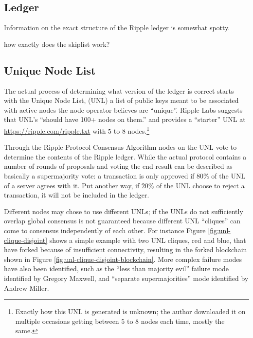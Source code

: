 \documentclass{article}
\begin{document}
\subsection{Ledger}

Information on the exact structure of the Ripple ledger is somewhat spotty.

how exactly does the skiplist work?


\subsection{Unique Node List}

The actual process of determining what version of the ledger is correct starts
with the Unique Node List, (UNL) a list of public keys meant to be associated
with active nodes the node operator believes are
``unique''.\cite{ripple-wiki-unl} Ripple Labs suggests that UNL's ``should have
100+ nodes on them.''\cite{ripple-wiki-unl} and provides a ``starter'' UNL at
\url{https://ripple.com/ripple.txt} with $5$ to $8$ nodes.\footnote{Exactly how this UNL is
generated is unknown; the author downloaded it on multiple occasions getting
between $5$ to $8$ nodes each time, mostly the same.}

Through the Ripple Protocol Consensus Algorithm\cite{ripple-consensus-paper}
nodes on the UNL vote to determine the contents of the Ripple ledger. While the
actual protocol contains a number of rounds of proposals and voting the end
result can be described as basically a supermajority vote: a transaction is
only approved if $80\%$ of the UNL of a server agrees with
it.\cite[3.2]{ripple-consensus-paper} Put another way, if $20\%$ of the UNL
choose to reject a transaction, it will not be included in the ledger.

Different nodes may chose to use different UNLs; if the UNLs do not
sufficiently overlap global consensus is not guaranteed because different UNL
``cliques'' can come to consensus independently of each other. For instance
Figure \ref{fig:unl-clique-disjoint} shows a simple example with two UNL
cliques, red and blue, that have forked because of insufficient connectivity,
resulting in the forked blockchain shown in Figure
\ref{fig:unl-clique-disjoint-blockchain}. More complex failure modes have also
been identified, such as the ``less than majority evil'' failure mode
identified by Gregory Maxwell,\cite{gmaxwell-btctalk-ripple} and ``separate
supermajorities'' mode identified by Andrew Miller.\cite{amiller-rippletalk}
\end{document}
